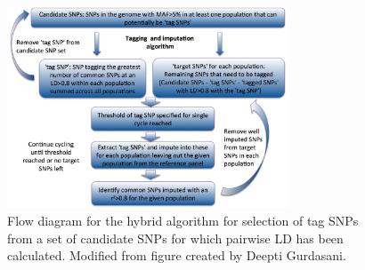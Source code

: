 \begin{figure}
\centering
\includegraphics[trim={0 0 0 0},clip,width=0.75\textwidth]{fig/SN13f1_mod}
\caption[Flow diagram for the hybrid algorithm for selection of tag \glspl{SNP} from a set of candidate \glspl{SNP}]{Flow diagram for the hybrid algorithm for selection of tag \glspl{SNP} from a set of candidate \glspl{SNP} for which pairwise \gls{LD} has been calculated. Modified from figure created by Deepti Gurdasani.}
\label{fig:SN13f1}
\end{figure}